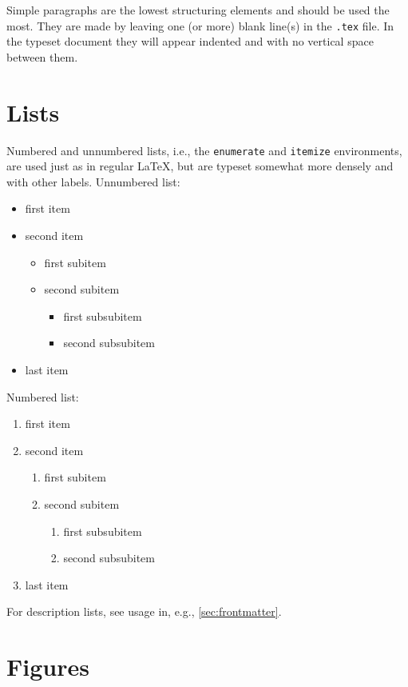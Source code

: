 {{Simple paragraphs are the lowest structuring elements and should be used the most. They are made by leaving one (or more) blank line(s) in the \texttt{.tex} file. In the typeset document they will appear indented and with no vertical space between them.

\section{Lists}

Numbered and unnumbered lists, i.e., the \texttt{enumerate} and \texttt{itemize} environments, are used just as in regular \LaTeX{}, but are typeset somewhat more densely and with other labels. Unnumbered list:
\begin{itemize}
    \item first item
    \item second item
    \begin{itemize}
        \item first subitem
        \item second subitem
        \begin{itemize}
            \item first subsubitem
            \item second subsubitem
        \end{itemize}
    \end{itemize}
    \item last item
\end{itemize}
Numbered list:
\begin{enumerate}
    \item first item
    \item second item
    \begin{enumerate}
        \item first subitem
        \item second subitem
        \begin{enumerate}
            \item first subsubitem
            \item second subsubitem
        \end{enumerate}
    \end{enumerate}
    \item last item
\end{enumerate}

For description lists, see usage in, e.g., \cref{sec:frontmatter}.

\section{Figures}

}}
